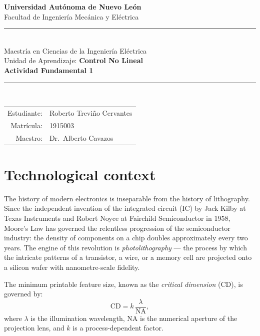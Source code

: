 \documentclass[11pt,letterpaper]{article}
\begin{document}
\thispagestyle{empty}
\begin{center}
  {\bfseries Universidad Autónoma de Nuevo León}\\
  Facultad de Ingeniería Mecánica y Eléctrica\\[0.6em]
  \textcolor{uanlBlue}{\rule{\linewidth}{1pt}}\\[0.6em]
  Maestría en Ciencias de la Ingeniería Eléctrica\\
  Unidad de Aprendizaje: \textbf{Control No Lineal}\\[1.2em]
  {\LARGE\bfseries Actividad Fundamental 1}\\[1em]
  \textcolor{uanlBlue}{\rule{0.6\linewidth}{0.4pt}}\\[1em]
  \begin{tabular}{rl}
    Estudiante: & Roberto Treviño Cervantes \\
    Matrícula:  & 1915003 \\
    Maestro:    & Dr.\ Alberto Cavazos \\
  \end{tabular}
\end{center}

\vfill
\newpage
\setcounter{page}{1}


\section*{Technological context}

The history of modern electronics is inseparable from the history of lithography. Since the independent invention of the integrated circuit (IC) by Jack Kilby at Texas Instruments and Robert Noyce at Fairchild Semiconductor in 1958, Moore's Law has governed the relentless progression of the semiconductor industry: the density of components on a chip doubles approximately every two years. The engine of this revolution is \textit{photolithography} --- the process by which the intricate patterns of a transistor, a wire, or a memory cell are projected onto a silicon wafer with nanometre-scale fidelity.

The minimum printable feature size, known as the \textit{critical dimension} (CD), is governed by:
\begin{equation}
    \mathrm{CD} = k\,\frac{\lambda}{\mathrm{NA}},
\end{equation}
where $\lambda$ is the illumination wavelength, $\mathrm{NA}$ is the numerical aperture of the projection lens, and $k$ is a process-dependent factor.
\end{document}
